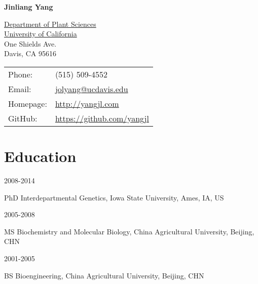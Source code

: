 \documentclass[letterpaper]{article}
\def\name{Jinliang Yang}
\begin{document}
\centerline{\huge \bf \name}

\vspace{0.25in}

\begin{minipage}{0.55\linewidth}
  \href{http://www.plantsciences.ucdavis.edu/plantsciences/}{Department of Plant Sciences} \\
  \href{http://www.ucdavis.edu/}{University of California} \\
  One Shields Ave.\\
  Davis, CA 95616 \\
\end{minipage}
\begin{minipage}{0.35\linewidth}
  \begin{tabular}{ll}
    Phone: & (515) 509-4552 \\
    Email: & \href{mailto:jolyang@ucdavis.edu}{jolyang@ucdavis.edu} \\
    Homepage: & \href{http://yangjl.com}{http://yangjl.com} \\
    GitHub: & \href{https://github.com/yangjl}{https://github.com/yangjl} \\
  \end{tabular}
\end{minipage}


\section*{Education}
\begin{minipage}{0.2\linewidth}
  2008-2014 \\
\end{minipage}
\begin{minipage}{0.7\linewidth}
  PhD Interdepartmental Genetics, Iowa State University, Ames, IA, US \\
\end{minipage}

\begin{minipage}{0.2\linewidth}
  2005-2008 \\
\end{minipage}
\begin{minipage}{0.7\linewidth}
  MS Biochemistry and Molecular Biology, China Agricultural University, Beijing, CHN \\
\end{minipage}

\begin{minipage}{0.2\linewidth}
  2001-2005 \\
\end{minipage}
\begin{minipage}{0.7\linewidth}
  BS Bioengineering, China Agricultural University, Beijing, CHN \\
\end{minipage}
\end{document}
